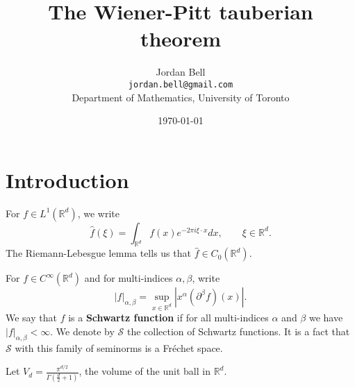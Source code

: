 \documentclass{article}
\theoremstyle{definition}
\begin{document}
\title{The Wiener-Pitt tauberian theorem}
\author{Jordan Bell\\ \texttt{jordan.bell@gmail.com}\\Department of Mathematics, University of Toronto}
\date{\today}

\maketitle

\section{Introduction}
For $f \in L^1(\mathbb{R}^d)$, we write
\[
\hat{f}(\xi) = \int_{\mathbb{R}^d} f(x) e^{-2\pi i\xi\cdot x} dx, \qquad \xi \in \mathbb{R}^d.
\]
The Riemann-Lebesgue lemma tells us that $\hat{f} \in C_0(\mathbb{R}^d)$. 

For $f \in C^\infty(\mathbb{R}^d)$ and for multi-indices $\alpha,\beta$, write
\[
|f|_{\alpha,\beta} = \sup_{x \in \mathbb{R}^d} |x^\alpha (\partial^\beta f)(x)|.
\]
We say that $f$ is a \textbf{Schwartz function} if  for all multi-indices $\alpha$ and $\beta$ we have
$|f|_{\alpha,\beta}<\infty$. We denote by $\mathscr{S}$ the collection of Schwartz functions. It is a fact that 
$\mathscr{S}$
with this family of seminorms is a Fr\'echet space. 

Let $V_d = \frac{\pi^{d/2}}{\Gamma\left( \frac{d}{2}+1 \right)}$, the volume of the unit ball
in $\mathbb{R}^d$. 
\end{document}
